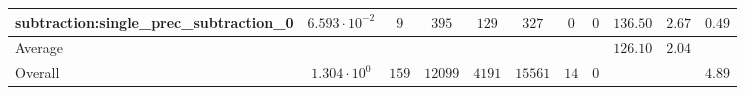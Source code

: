 \begin{tabular}{|l|c|c|c|c|c|c|c|c|c|c|}
subtraction:single\_prec\_subtraction\_0         & $ 6.593 \cdot 10^{-2} $ & $ 9      $ & $ 395   $ & $ 129  $ & $ 327   $ & $ 0  $ & $ 0 $ & $ 136.50      $ & $ 2.67    $ & $ 0.49    $ \\
\hline
Average                                          & $                     $ & $        $ & $       $ & $      $ & $       $ & $    $ & $   $ & $ 126.10      $ & $ 2.04    $ & $         $ \\
\hline
Overall                                          & $ 1.304 \cdot 10^{0}  $ & $ 159    $ & $ 12099 $ & $ 4191 $ & $ 15561 $ & $ 14 $ & $ 0 $ & $             $ & $         $ & $ 4.89    $ \\
\hline
\end{tabular}
